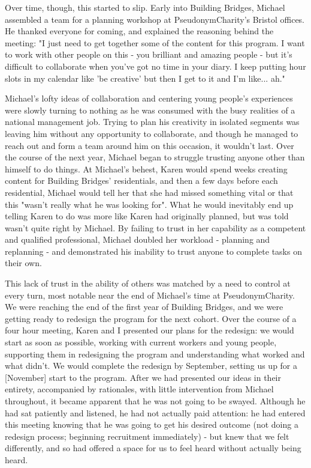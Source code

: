 Over time, though, this started to slip. Early into Building Bridges, Michael assembled a team for a planning workshop at PseudonymCharity's Bristol offices. He thanked everyone for coming, and explained the reasoning behind the meeting:
"I just need to get together some of the content for this program. I want to work with other people on this - you brilliant and amazing people - but it's difficult to collaborate when you've got no time in your diary. I keep putting hour slots in my calendar like 'be creative' but then I get to it and I'm like... ah."

Michael's lofty ideas of collaboration and centering young people's experiences were slowly turning to nothing as he was consumed with the busy realities of a national management job. Trying to plan his creativity in isolated segments was leaving him without any opportunity to collaborate, and though he managed to reach out and form a team around him on this occasion, it wouldn't last. Over the course of the next year, Michael began to struggle trusting anyone other than himself to do things. At Michael's behest, Karen would spend weeks creating content for Building Bridges' residentials, and then a few days before each residential, Michael would tell her that she had missed something vital or that this "wasn't really what he was looking for". What he would inevitably end up telling Karen to do was more like Karen had originally planned, but was told wasn't quite right by Michael. By failing to trust in her capability as a competent and qualified professional, Michael doubled her workload - planning and replanning - and demonstrated his inability to trust anyone to complete tasks on their own.

This lack of trust in the ability of others was matched by a need to control at every turn, most notable near the end of Michael's time at PseudonymCharity. We were reaching the end of the first year of Building Bridges, and we were getting ready to redesign the program for the next cohort. Over the course of a four hour meeting, Karen and I presented our plans for the redesign: we would start as soon as possible, working with current workers and young people, supporting them in redesigning the program and understanding what worked and what didn't. We would complete the redesign by September, setting us up for a [November] start to the program. After we had presented our ideas in their entirety, accompanied by rationales, with little intervention from Michael throughout, it became apparent that he was not going to be swayed. Although he had sat patiently and listened, he had not actually paid attention: he had entered this meeting knowing that he was going to get his desired outcome (not doing a redesign process; beginning recruitment immediately) - but knew that we felt differently, and so had offered a space for us to feel heard without actually being heard.


